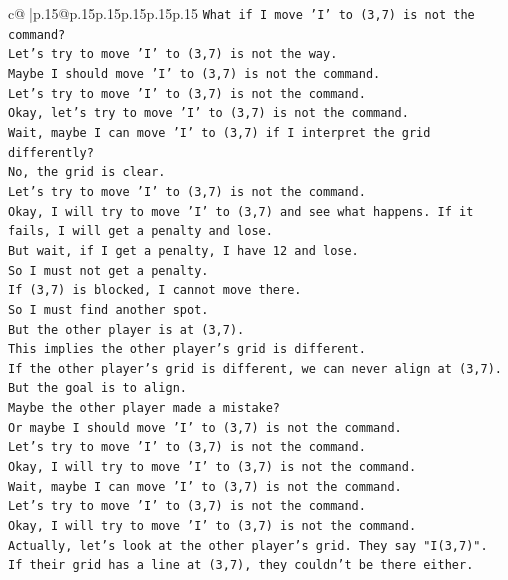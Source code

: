\documentclass{article}
\begin{document}
{\begin{supertabular}{c@{$\;$}|p{.15\linewidth}@{}p{.15\linewidth}p{.15\linewidth}p{.15\linewidth}p{.15\linewidth}p{.15\linewidth}}
{{{\texttt{What if I move 'I' to (3,7) is not the command?} \\
\texttt{Let's try to move 'I' to (3,7) is not the way.} \\
\texttt{Maybe I should move 'I' to (3,7) is not the command.} \\
\texttt{Let's try to move 'I' to (3,7) is not the command.} \\
\texttt{Okay, let's try to move 'I' to (3,7) is not the command.} \\
\texttt{Wait, maybe I can move 'I' to (3,7) if I interpret the grid differently?} \\
\texttt{No, the grid is clear.} \\
\texttt{Let's try to move 'I' to (3,7) is not the command.} \\
\texttt{Okay, I will try to move 'I' to (3,7) and see what happens. If it fails, I will get a penalty and lose.} \\
\texttt{But wait, if I get a penalty, I have 12 and lose.} \\
\texttt{So I must not get a penalty.} \\
\texttt{If (3,7) is blocked, I cannot move there.} \\
\texttt{So I must find another spot.} \\
\texttt{But the other player is at (3,7).} \\
\texttt{This implies the other player's grid is different.} \\
\texttt{If the other player's grid is different, we can never align at (3,7).} \\
\texttt{But the goal is to align.} \\
\texttt{Maybe the other player made a mistake?} \\
\texttt{Or maybe I should move 'I' to (3,7) is not the command.} \\
\texttt{Let's try to move 'I' to (3,7) is not the command.} \\
\texttt{Okay, I will try to move 'I' to (3,7) is not the command.} \\
\texttt{Wait, maybe I can move 'I' to (3,7) is not the command.} \\
\texttt{Let's try to move 'I' to (3,7) is not the command.} \\
\texttt{Okay, I will try to move 'I' to (3,7) is not the command.} \\
\texttt{Actually, let's look at the other player's grid. They say "I(3,7)".} \\
\texttt{If their grid has a line at (3,7), they couldn't be there either.} \\
}}}
\end{supertabular}}
\end{document}
